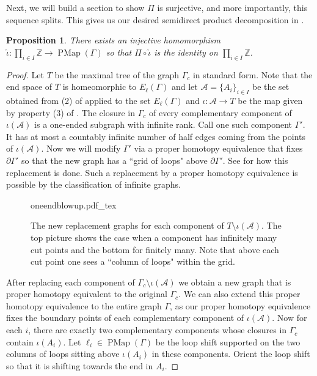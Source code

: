 \documentclass[11pt]{amsart}
\theoremstyle{plain}
\newtheorem{PROP}[THM]{Proposition}
\theoremstyle{definition}
\DeclareMathOperator{\PMap}{PMap}
\newcommand{\Z}{\mathbb{Z}}
\newcommand{\cA}{\mathcal{A}}
\def\G{{\Gamma}}
\newcommand{\<}{\langle}
\renewcommand{\>}{\rangle}
\begin{document}
Next, we will build a section to show $\Pi$ is surjective, and more importantly, this sequence splits. This gives us our desired semidirect product decomposition in .

\begin{PROP} \label{prop:sectionconstruct}
    There exists an injective homomorphism $\hat{\iota}:\prod_{i\in I} \Z \rightarrow \PMap(\G)$ so that $\Pi \circ \hat{\iota}$ is the identity on $\prod_{i \in I}\Z$.
\end{PROP}

\begin{proof}
    Let $T$ be the maximal tree of the graph $\G_{c}$ in standard form. Note that the end space of $T$ is homeomorphic to $E_{\ell}(\G)$ and let $\cA=\{A_i\}_{i \in I}$ be the set obtained from (2) of  applied to the set $E_{\ell}(\G)$ and $\iota:\cA \rightarrow T$ be the map given by property (3) of . The closure in $\G_{c}$ of every complementary component of $\iota(\cA)$ is a one-ended subgraph with infinite rank. Call one such component $\G'$. It has at most a countably infinite number of half edges coming from the points of $\iota(\cA)$. Now we will modify $\G'$ via a proper homotopy equivalence that fixes $\partial\G'$ so that the new graph has a ``grid of loops" above $\partial\G'$. See  for how this replacement is done. Such a replacement by a proper homotopy equivalence is possible by the classification of infinite graphs. 
    \begin{figure}[ht!]
	    \centering
	    \def\svgwidth{\textwidth}
		    {oneendblowup.pdf_tex}
		    \caption{The new replacement graphs for each component of $T \setminus \iota(\cA)$. The top picture shows the case when a component has infinitely many cut points and the bottom for finitely many. Note that above each cut point one sees a ``column of loops" within the grid.}
	    \label{fig:oneendblowup}
    \end{figure}

    After replacing each component of $\G_{c} \setminus\iota(\cA)$ we obtain a new graph that is proper homotopy equivalent to the original $\G_{c}$. We can also extend this proper homotopy equivalence to the entire graph $\G$, as our proper homotopy equivalence fixes the boundary points of each complementary component of $\iota(\cA)$. Now for each $i$, there are exactly two complementary components whose closures in $\G_c$ contain $\iota(A_{i})$. Let $\ell_{i} \in \PMap(\G)$ be the loop shift supported on the two columns of loops sitting above $\iota(A_{i})$ in these components. Orient the loop shift so that it is shifting towards the end in $A_{i}$.


\end{proof}
\end{document}
